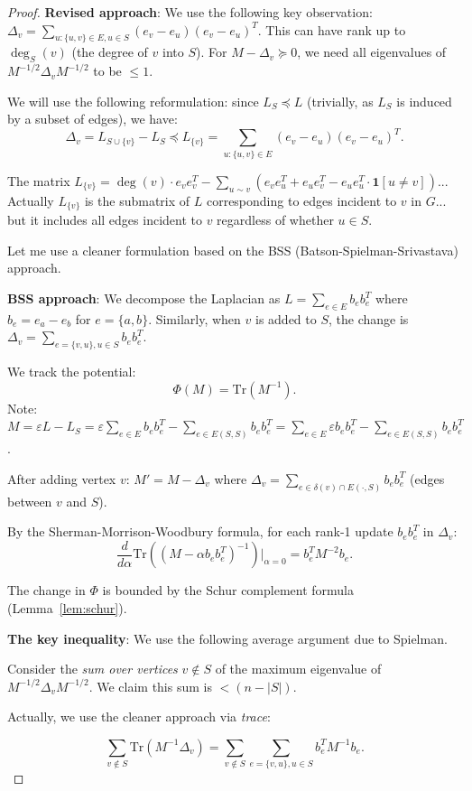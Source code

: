 \documentclass[12pt]{article}
\theoremstyle{definition}
\begin{document}
\begin{proof}
\textbf{Revised approach}: We use the following key observation: $\Delta_v = \sum_{u: \{u,v\}\in E, u\in S}(e_v-e_u)(e_v-e_u)^T$. This can have rank up to $\deg_S(v)$ (the degree of $v$ into $S$). For $M - \Delta_v \succeq 0$, we need all eigenvalues of $M^{-1/2}\Delta_v M^{-1/2}$ to be $\leq 1$.

We will use the following reformulation: since $L_S \preceq L$ (trivially, as $L_S$ is induced by a subset of edges), we have:
$$\Delta_v = L_{S\cup\{v\}} - L_S \preceq L_{\{v\}} = \sum_{u:\{u,v\}\in E}(e_v-e_u)(e_v-e_u)^T.$$

The matrix $L_{\{v\}} = \deg(v)\cdot e_v e_v^T - \sum_{u\sim v}(e_v e_u^T + e_u e_v^T - e_u e_u^T \cdot \mathbf{1}[u\neq v])$... Actually $L_{\{v\}}$ is the submatrix of $L$ corresponding to edges incident to $v$ in $G$... but it includes all edges incident to $v$ regardless of whether $u\in S$.

Let me use a cleaner formulation based on the BSS (Batson-Spielman-Srivastava) approach.

\textbf{BSS approach}: We decompose the Laplacian as $L = \sum_{e\in E} b_e b_e^T$ where $b_e = e_a - e_b$ for $e = \{a,b\}$. Similarly, when $v$ is added to $S$, the change is $\Delta_v = \sum_{e=\{v,u\}, u\in S} b_e b_e^T$.

We track the potential:
$$\Phi(M) = \mathrm{Tr}(M^{-1}).$$
Note: $M = \varepsilon L - L_S = \varepsilon\sum_{e\in E}b_eb_e^T - \sum_{e\in E(S,S)}b_eb_e^T = \sum_{e\in E}\varepsilon b_e b_e^T - \sum_{e\in E(S,S)}b_eb_e^T$.

After adding vertex $v$: $M' = M - \Delta_v$ where $\Delta_v = \sum_{e\in\delta(v)\cap E(\cdot,S)}b_eb_e^T$ (edges between $v$ and $S$).

By the Sherman-Morrison-Woodbury formula, for each rank-1 update $b_e b_e^T$ in $\Delta_v$:
$$\frac{d}{d\alpha}\mathrm{Tr}((M - \alpha b_e b_e^T)^{-1})\bigg|_{\alpha=0} = b_e^T M^{-2} b_e.$$

The change in $\Phi$ is bounded by the Schur complement formula (Lemma~\ref{lem:schur}).

\textbf{The key inequality}: We use the following average argument due to Spielman.

Consider the \emph{sum over vertices} $v\notin S$ of the maximum eigenvalue of $M^{-1/2}\Delta_v M^{-1/2}$. We claim this sum is $< (n-|S|)$.

Actually, we use the cleaner approach via \emph{trace}:

\begin{equation}\label{eq:sum-trace}
\sum_{v\notin S}\mathrm{Tr}(M^{-1}\Delta_v) = \sum_{v\notin S}\sum_{e=\{v,u\},u\in S} b_e^T M^{-1} b_e.
\end{equation}


\end{proof}
\end{document}
